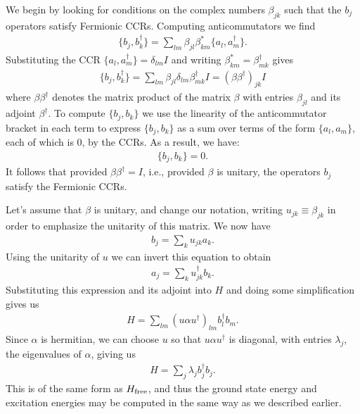 \documentclass[12pt]{article}
\begin{document}
{We begin by looking for conditions on the complex numbers $\beta_{jk}$
such that the $b_j$ operators satisfy Fermionic CCRs.  Computing
anticommutators we find
\begin{eqnarray}
  \{ b_j, b_k^\dagger \} = \sum_{lm} \beta_{jl} \beta_{km}^* \{ a_l,a_m^\dagger \}.
\end{eqnarray}
Substituting the CCR $\{ a_l,a_m^\dagger \} = \delta_{lm} I$ and
writing $\beta_{km}^* = \beta_{mk}^\dagger$ gives
\begin{eqnarray}
  \{ b_j, b_k^\dagger \} = \sum_{lm} \beta_{jl} \delta_{lm} \beta_{mk}^\dagger I= (\beta \beta^\dagger)_{jk} I
\end{eqnarray}
where $\beta \beta^\dagger$ denotes the matrix product of the matrix
$\beta$ with entries $\beta_{jl}$ and its adjoint $\beta^\dagger$. To
compute $\{b_j,b_k\}$ we use the linearity of the anticommutator
bracket in each term to express $\{b_j,b_k\}$ as a sum over terms of
the form $\{ a_l,a_m \}$, each of which is $0$, by the CCRs.  As a
result, we have:
\begin{eqnarray}
  \{ b_j,b_k \} = 0.
\end{eqnarray}
It follows that provided $\beta \beta^\dagger = I$, i.e., provided
$\beta$ is unitary, the operators $b_j$ satisfy the Fermionic CCRs.

Let's assume that $\beta$ is unitary, and change our notation, writing
$u_{jk} \equiv \beta_{jk}$ in order to emphasize the unitarity of this
matrix.  We now have
\begin{eqnarray}
  b_j = \sum_k u_{jk} a_k.
\end{eqnarray}
Using the unitarity of $u$ we can invert this equation to obtain
\begin{eqnarray}
  a_j = \sum_k u^\dagger_{jk} b_k.
\end{eqnarray}
Substituting this expression and its adjoint into $H$ and doing some
simplification gives us
\begin{eqnarray}
  H = \sum_{lm} (u \alpha u^\dagger)_{lm} b_l^\dagger b_m.
\end{eqnarray}
Since $\alpha$ is hermitian, we can choose $u$ so that $u \alpha
u^\dagger$ is diagonal, with entries $\lambda_j$, the eigenvalues of
$\alpha$, giving us
\begin{eqnarray}
  H = \sum_j \lambda_j b_j^\dagger b_j.
\end{eqnarray}
This is of the same form as $H_{\rm free}$, and thus the ground state
energy and excitation energies may be computed in the same way as we
described earlier.

}
\end{document}
